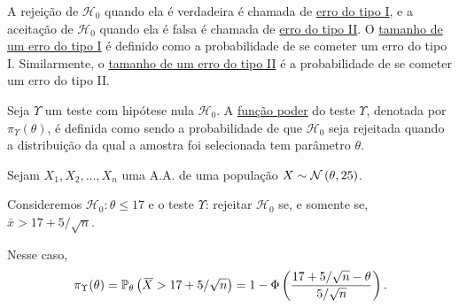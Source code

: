 \begin{definition}
A rejeição de $\mathcal{H}_0$ quando ela é verdadeira é chamada de \uline{erro do tipo I}, e a aceitação de $\mathcal{H}_0$ quando ela é falsa é chamada de \uline{erro do tipo II}. O \uline{tamanho de um erro do tipo I} é definido como a probabilidade de se cometer um erro do tipo I. Similarmente, o \uline{tamanho de um erro do tipo II} é a probabilidade de se cometer um erro do tipo II.
\end{definition}

\begin{definition}
Seja $\Upsilon$ um teste com hipótese nula $\mathcal{H}_0$. A \uline{função poder} do teste $\Upsilon$, denotada por $\pi_\Upsilon(\theta)$, é definida como sendo a probabilidade de que $\mathcal{H}_0$ seja rejeitada quando a distribuição da qual a amostra foi selecionada tem parâmetro $\theta$.
\end{definition}

\begin{example}
Sejam $X_1,X_2,\ldots,X_n$ uma A.A. de uma população $X\sim\normdist{\theta,25}$.

Consideremos $\mathcal{H}_0:\theta\leq17$ e o teste $\Upsilon$: rejeitar $\mathcal{H}_0$ se, e somente se, $\bar{x}>17+5/\sqrt{n}$.

Nesse caso,
\begin{equation}
\pi_\Upsilon(\theta)=\P_\theta\left(\bar{X}>17+5/\sqrt{n}\right)=1-\Phi\left(\frac{17+5/\sqrt{n}-\theta}{5/\sqrt{n}}\right).
\end{equation}
\end{example}

